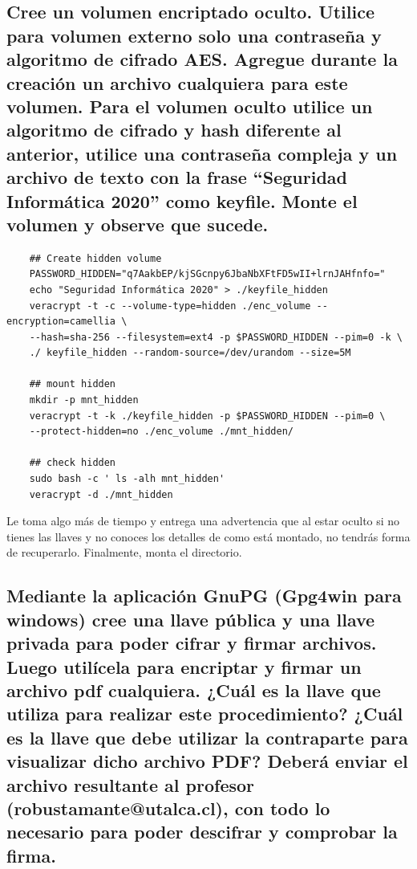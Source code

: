 \documentclass[11pt]{utalcaDoc}
\begin{document}
\subsection{Cree un volumen encriptado oculto. Utilice para volumen externo solo una contraseña y algoritmo de cifrado AES. Agregue durante la creación un archivo cualquiera para este volumen. Para el volumen oculto utilice un algoritmo de cifrado y hash diferente al anterior, utilice una contraseña compleja y un archivo de texto con la frase “Seguridad Informática 2020” como keyfile. Monte el volumen y observe que sucede.}


\begin{verbatim}
	## Create hidden volume
	PASSWORD_HIDDEN="q7AakbEP/kjSGcnpy6JbaNbXFtFD5wII+lrnJAHfnfo="
	echo "Seguridad Informática 2020" > ./keyfile_hidden
	veracrypt -t -c --volume-type=hidden ./enc_volume --encryption=camellia \
	--hash=sha-256 --filesystem=ext4 -p $PASSWORD_HIDDEN --pim=0 -k \ 
	./ keyfile_hidden --random-source=/dev/urandom --size=5M

	## mount hidden
	mkdir -p mnt_hidden
	veracrypt -t -k ./keyfile_hidden -p $PASSWORD_HIDDEN --pim=0 \ 
	--protect-hidden=no ./enc_volume ./mnt_hidden/

	## check hidden
	sudo bash -c ' ls -alh mnt_hidden'
	veracrypt -d ./mnt_hidden
\end{verbatim}

Le toma algo más de tiempo y entrega una advertencia que al estar oculto si no tienes las llaves y no conoces los detalles de como está montado, no tendrás forma de recuperarlo. Finalmente, monta el directorio.

\subsection{Mediante la aplicación GnuPG (Gpg4win para windows) cree una llave pública y una llave privada para poder cifrar y firmar archivos. Luego utilícela para encriptar y firmar un archivo pdf cualquiera. ¿Cuál es la llave que utiliza para realizar este procedimiento? ¿Cuál es la llave que debe utilizar la contraparte para visualizar dicho archivo PDF? Deberá enviar el archivo resultante al profesor (robustamante@utalca.cl), con todo lo necesario para poder descifrar y comprobar la firma.}
\end{document}
